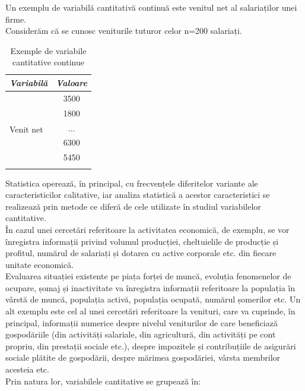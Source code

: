 \documentclass[
  11pt,
  b5paper,
  nottoc]{book}
\begin{document}
Un exemplu de variabilă cantitativă continuă este venitul net al
salariaților unei firme.\\
Considerăm că se cunosc veniturile tuturor celor n=200 salariați.

\begin{table}[!h]
\centering
\caption{Exemple de variabile cantitative continue}
\label{my-label}
\begin{tabular}{@{}lc@{}}
\toprule
\multicolumn{1}{c}{\textit{Variabilă}} & \multicolumn{1}{c}{\textit{Valoare}} \\ \midrule
\multirow{6}{*}{Venit net}             & 3500                                  \\
                                       & 1800                                  \\
                                       & ...                                  \\
                                       & 6300                                  \\
                                       & 5450                                  \\ \cmidrule(l){2-2} 
\end{tabular}
\end{table}

Statistica operează, în principal, cu frecvențele diferitelor variante
ale caracteristicilor calitative, iar analiza statistică a acestor
caracteristici se realizează prin metode ce diferă de cele utilizate în
studiul variabilelor cantitative.\\
În cazul unei cercetări referitoare la activitatea economică, de
exemplu, se vor înregistra informații privind volumul producției,
cheltuielile de producție și profitul, numărul de salariați și dotarea
cu active corporale etc. din fiecare unitate economică.\\
Evaluarea situației existente pe piața forței de muncă, evoluția
fenomenelor de ocupare, șomaj și inactivitate va înregistra informații
referitoare la populația în vârstă de muncă, populația activă, populația
ocupată, numărul șomerilor etc. Un alt exemplu este cel al unei
cercetări referitoare la venituri, care va cuprinde, în principal,
informații numerice despre nivelul veniturilor de care beneficiază
gospodăriile (din activități salariale, din agricultură, din activități
pe cont propriu, din prestații sociale etc.), despre impozitele și
contribuțiile de asigurări sociale plătite de gospodării, despre mărimea
gospodăriei, vârsta membrilor acesteia etc.\\
Prin natura lor, variabilele cantitative se grupează în:
\end{document}
